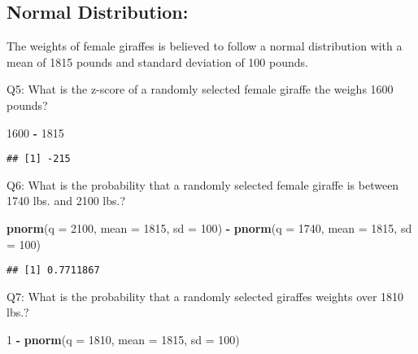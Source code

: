 \documentclass[]{article}
\newenvironment{Shaded}{\begin{snugshade}}{\end{snugshade}}
\newcommand{\DataTypeTok}[1]{\textcolor[rgb]{0.13,0.29,0.53}{#1}}
\newcommand{\DecValTok}[1]{\textcolor[rgb]{0.00,0.00,0.81}{#1}}
\newcommand{\KeywordTok}[1]{\textcolor[rgb]{0.13,0.29,0.53}{\textbf{#1}}}
\newcommand{\NormalTok}[1]{#1}
\newcommand{\OperatorTok}[1]{\textcolor[rgb]{0.81,0.36,0.00}{\textbf{#1}}}
\newcommand{\StringTok}[1]{\textcolor[rgb]{0.31,0.60,0.02}{#1}}
\begin{document}
\newpage

\hypertarget{normal-distribution}{%
\subsection{Normal Distribution:}\label{normal-distribution}}

The weights of female giraffes is believed to follow a normal
distribution with a mean of 1815 pounds and standard deviation of 100
pounds.

Q5: What is the z-score of a randomly selected female giraffe the weighs
1600 pounds?

\begin{Shaded}
\begin{Highlighting}[]
\DecValTok{1600} \OperatorTok{-}\StringTok{ }\DecValTok{1815}
\end{Highlighting}
\end{Shaded}

\begin{verbatim}
## [1] -215
\end{verbatim}

Q6: What is the probability that a randomly selected female giraffe is
between 1740 lbs. and 2100 lbs.?

\begin{Shaded}
\begin{Highlighting}[]
\KeywordTok{pnorm}\NormalTok{(}\DataTypeTok{q =} \DecValTok{2100}\NormalTok{, }\DataTypeTok{mean =} \DecValTok{1815}\NormalTok{, }\DataTypeTok{sd =} \DecValTok{100}\NormalTok{) }\OperatorTok{-}\StringTok{ }\KeywordTok{pnorm}\NormalTok{(}\DataTypeTok{q =} \DecValTok{1740}\NormalTok{, }\DataTypeTok{mean =} \DecValTok{1815}\NormalTok{, }\DataTypeTok{sd =} \DecValTok{100}\NormalTok{)}
\end{Highlighting}
\end{Shaded}

\begin{verbatim}
## [1] 0.7711867
\end{verbatim}

Q7: What is the probability that a randomly selected giraffes weights
over 1810 lbs.?

\begin{Shaded}
\begin{Highlighting}[]
\DecValTok{1} \OperatorTok{-}\StringTok{ }\KeywordTok{pnorm}\NormalTok{(}\DataTypeTok{q =} \DecValTok{1810}\NormalTok{, }\DataTypeTok{mean =} \DecValTok{1815}\NormalTok{, }\DataTypeTok{sd =} \DecValTok{100}\NormalTok{)}
\end{Highlighting}
\end{Shaded}
\end{document}
